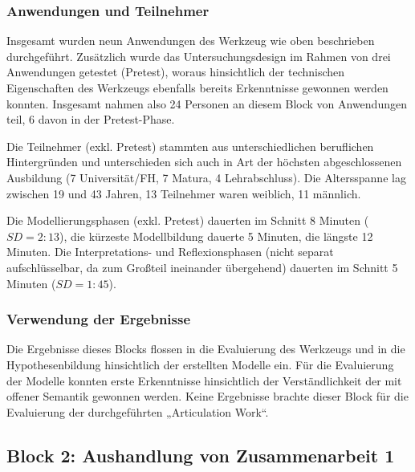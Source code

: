 
\subsubsection{Anwendungen und Teilnehmer} %
\label{ssub:1_teilnehmer}

Insgesamt wurden neun Anwendungen des Werkzeug wie oben beschrieben durchgeführt. Zusätzlich wurde das Untersuchungsdesign im Rahmen von drei Anwendungen getestet (Pretest), woraus hinsichtlich der technischen Eigenschaften des Werkzeugs ebenfalls bereits Erkenntnisse gewonnen werden konnten. Insgesamt nahmen also 24 Personen an diesem Block von Anwendungen teil, 6 davon in der Pretest-Phase.

Die Teilnehmer (exkl. Pretest) stammten aus unterschiedlichen beruflichen Hintergründen und unterschieden sich auch in Art der höchsten abgeschlossenen Ausbildung (7 Universität/FH, 7 Matura, 4 Lehrabschluss). Die Altersspanne lag zwischen 19 und 43 Jahren, 13 Teilnehmer waren weiblich, 11 männlich.

Die Modellierungsphasen (exkl. Pretest) dauerten im Schnitt 8 Minuten ($SD=2:13$), die kürzeste Modellbildung dauerte 5 Minuten, die längste 12 Minuten. Die Interpretations- und Reflexionsphasen (nicht separat aufschlüsselbar, da zum Großteil ineinander übergehend) dauerten im Schnitt 5 Minuten ($SD=1:45$). 


\subsubsection{Verwendung der Ergebnisse} %
\label{ssub:1_verwendung_der_ergebnisse}

Die Ergebnisse dieses Blocks flossen in die Evaluierung des Werkzeugs und in die Hypothesenbildung hinsichtlich der erstellten Modelle ein. Für die Evaluierung der Modelle konnten erste Erkenntnisse hinsichtlich der Verständlichkeit der mit offener Semantik gewonnen werden. Keine Ergebnisse brachte dieser Block für die Evaluierung der durchgeführten „Articulation Work“.


\subsection{Block 2: Aushandlung von Zusammenarbeit 1}
\label{sub:eval_2}

